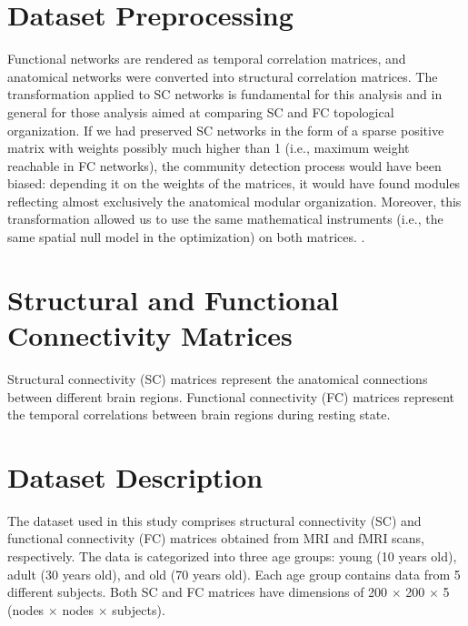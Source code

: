 
\section{Dataset Preprocessing}
Functional networks are rendered as temporal correlation matrices, and anatomical networks were converted into structural 
correlation matrices.
The transformation applied to SC networks is fundamental for this analysis and in general for those analysis aimed at 
comparing SC and FC topological organization. 
If we had preserved SC networks in the form of a sparse positive matrix with
weights possibly much higher than 1 (i.e., maximum weight reachable in FC networks), the community detection process would  
have been biased: depending it on the weights of the matrices, it would have found modules reflecting almost exclusively 
the anatomical modular organization.
Moreover, this transformation allowed us to use the same mathematical instruments (i.e., the same spatial null model in 
the optimization) on both matrices.
\cite{Puxeddu2022}.

\section{Structural and Functional Connectivity Matrices}
Structural connectivity (SC) matrices represent the anatomical connections between different brain regions.
Functional connectivity (FC) matrices represent the temporal correlations between brain regions during resting state.

\section{Dataset Description}
The dataset used in this study comprises structural connectivity (SC) and functional connectivity (FC) matrices 
obtained from MRI and fMRI scans, respectively. The data is categorized into three age groups: 
young (10 years old), adult (30 years old), and old (70 years old). Each age group contains data from 5 different subjects.
Both SC and FC matrices have dimensions of 200 $\times$ 200 $\times$ 5 (nodes $\times$ nodes $\times$ subjects).

